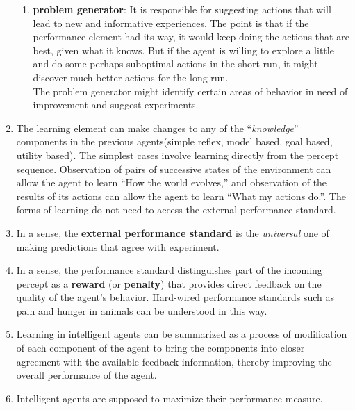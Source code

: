 \begin{enumerate}[itemsep=0.2cm]
\begin{enumerate}[itemsep=0.1cm]
        \item \textbf{problem generator}: It is responsible for suggesting actions that will lead to new and informative experiences. The point is that if the performance element had its way, it would keep doing the actions that are best, given what it knows. But if the agent is willing to explore a little and do some perhaps suboptimal actions in the short run, it might discover much better actions for the long run. 
        \hfill \cite{ai/book/Artificial-Intelligence-A-Modern-Approach/Russell-Norvig}
        \\
        The problem generator might identify certain areas of behavior in need of improvement and suggest experiments.
        \hfill \cite{ai/book/Artificial-Intelligence-A-Modern-Approach/Russell-Norvig}
         
    \end{enumerate}

    \item The learning element can make changes to any of the “\textit{knowledge}” components in the previous agents(simple reflex, model based, goal based, utility based). The simplest cases involve learning directly from the percept sequence. Observation of pairs of successive states of the environment can allow the agent to learn “How the world evolves,” and observation of the results of its actions can allow the agent to learn “What my actions do.”.
    The forms of learning do not need to access the external performance standard.
    \hfill \cite{ai/book/Artificial-Intelligence-A-Modern-Approach/Russell-Norvig}


    \item In a sense, the \textbf{external performance standard} is the \textit{universal} one of making predictions that agree with experiment.
    \hfill \cite{ai/book/Artificial-Intelligence-A-Modern-Approach/Russell-Norvig}

    \item  In a sense, the performance standard distinguishes part of the incoming percept as a \textbf{reward} (or \textbf{penalty}) that provides direct feedback on the quality of the agent’s behavior. Hard-wired performance standards such as pain and hunger in animals can be understood in this way.
    \hfill \cite{ai/book/Artificial-Intelligence-A-Modern-Approach/Russell-Norvig}

    \item Learning in intelligent agents can be summarized as a process of modification of each component of the agent to bring the components into closer agreement with the available feedback information, thereby improving the overall performance of the agent.
    \hfill \cite{ai/book/Artificial-Intelligence-A-Modern-Approach/Russell-Norvig}

    \item Intelligent agents are supposed to maximize their performance measure.
    \hfill \cite{ai/book/Artificial-Intelligence-A-Modern-Approach/Russell-Norvig}
\end{enumerate}


